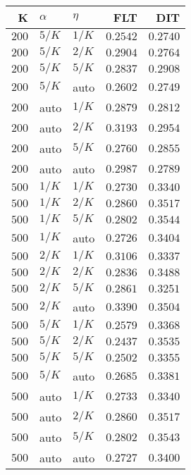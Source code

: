 \begin{table}
\begin{spacing}{1.2}
{\begin{tabular}{rll|rr}
\bottomrule
\end{tabular}
} \hfill \parbox{.45\linewidth}{\centering \begin{tabular}{rll|rr}
\toprule
    K &  $\alpha$ &    $\eta$ &           FLT &           DIT \\
\midrule
$200$ &  $5/K$ &  $1/K$ &      $0.2542$ &      $0.2740$ \\
$200$ &  $5/K$ &  $2/K$ &      $0.2904$ &      $0.2764$ \\
$200$ &  $5/K$ &  $5/K$ &      $0.2837$ &      $0.2908$ \\
$200$ &  $5/K$ &   auto &      $0.2602$ &      $0.2749$ \\
$200$ &   auto &  $1/K$ &      $0.2879$ &      $0.2812$ \\
$200$ &   auto &  $2/K$ &      $0.3193$ &      $0.2954$ \\
$200$ &   auto &  $5/K$ &      $0.2760$ &      $0.2855$ \\
$200$ &   auto &   auto &      $0.2987$ &      $0.2789$ \\
\myrowcolor $500$ &  $1/K$ &  $1/K$ &      $0.2730$ &      $0.3340$ \\
$500$ &  $1/K$ &  $2/K$ &      $0.2860$ &      $0.3517$ \\
$500$ &  $1/K$ &  $5/K$ &      $0.2802$ & $\bm{0.3544}$ \\
$500$ &  $1/K$ &   auto &      $0.2726$ &      $0.3404$ \\
$500$ &  $2/K$ &  $1/K$ &      $0.3106$ &      $0.3337$ \\
$500$ &  $2/K$ &  $2/K$ &      $0.2836$ &      $0.3488$ \\
$500$ &  $2/K$ &  $5/K$ &      $0.2861$ &      $0.3251$ \\
$500$ &  $2/K$ &   auto & $\bm{0.3390}$ &      $0.3504$ \\
$500$ &  $5/K$ &  $1/K$ &      $0.2579$ &      $0.3368$ \\
$500$ &  $5/K$ &  $2/K$ &      $0.2437$ &      $0.3535$ \\
$500$ &  $5/K$ &  $5/K$ &      $0.2502$ &      $0.3355$ \\
$500$ &  $5/K$ &   auto &      $0.2685$ &      $0.3381$ \\
$500$ &   auto &  $1/K$ &      $0.2733$ &      $0.3340$ \\
$500$ &   auto &  $2/K$ &      $0.2860$ &      $0.3517$ \\
$500$ &   auto &  $5/K$ &      $0.2802$ &      $0.3543$ \\
$500$ &   auto &   auto &      $0.2727$ &      $0.3400$ \\
\bottomrule
\end{tabular}
}
\end{spacing}
\end{table}
